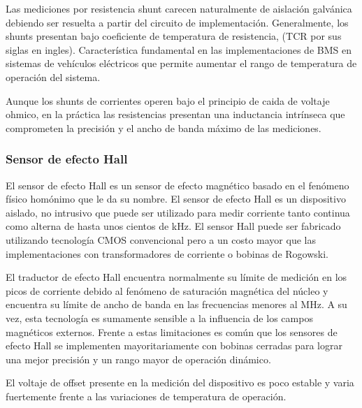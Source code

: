 \documentclass[10pt,a4paper]{article}
\begin{document}
Las mediciones por resistencia shunt carecen naturalmente de aislación galvánica
debiendo ser resuelta a partir del circuito de implementación. Generalmente, los
shunts presentan bajo coeficiente de temperatura de resistencia, (\acrfull{TCR}
por sus siglas en ingles). Característica fundamental en las implementaciones de
\acrshort{BMS} en sistemas de vehículos eléctricos que permite aumentar el rango
de temperatura de operación del sistema.

Aunque los shunts de corrientes operen bajo el principio de caida de voltaje
ohmico, en la práctica las resistencias presentan una inductancia intrínseca que
comprometen la precisión y el ancho de banda máximo de las mediciones.

\subsubsection{Sensor de efecto Hall}

El sensor de efecto Hall es un sensor de efecto magnético basado en el fenómeno
físico homónimo que le da su nombre.  El sensor de efecto Hall es un dispositivo
aislado, no intrusivo que puede ser utilizado para medir corriente tanto
continua como alterna de hasta unos cientos de kHz. El sensor Hall puede ser
fabricado utilizando tecnología CMOS convencional pero a un costo mayor que las
implementaciones con transformadores de corriente o bobinas de Rogowski.

El traductor de efecto Hall encuentra normalmente su límite de medición en los
picos de corriente debido al fenómeno de saturación magnética del núcleo y
encuentra su límite de ancho de banda en las frecuencias menores al MHz. A su
vez, esta tecnología es sumamente sensible a la influencia de los campos
magnéticos externos. Frente a estas limitaciones es común que los sensores de
efecto Hall se implementen mayoritariamente con bobinas cerradas para lograr una
mejor precisión y un rango mayor de operación dinámico.

El voltaje de offset presente en la medición del dispositivo es poco estable y
varia fuertemente frente a las variaciones de temperatura de operación.
\end{document}
